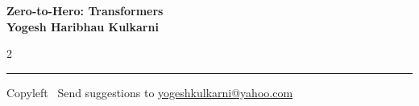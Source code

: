 \documentclass[8pt,landscape]{article}
\begin{document}
\footnotesize


\begin{center}
\Large{\textbf{Zero-to-Hero: Transformers\\ Yogesh Haribhau Kulkarni}}
\end{center}

\begin{multicols}{2}

\end{multicols}

\rule{\linewidth}{0.25pt}
\scriptsize
Copyleft \textcopyleft\  Send suggestions to
\href{http://www.yogeshkulkarni.com}{yogeshkulkarni@yahoo.com}
\end{document}
